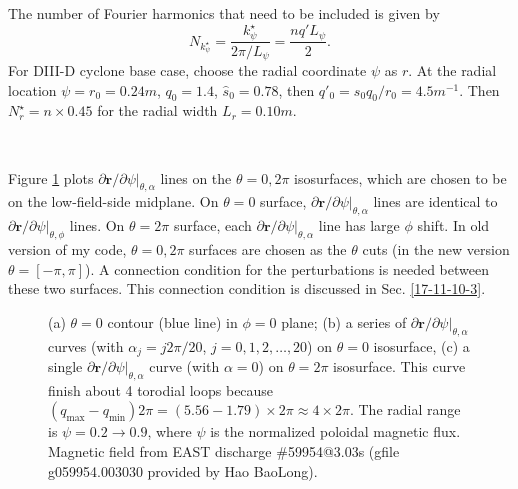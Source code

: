 \documentclass{article}
\newcommand{\nobracket}{}
\begin{document}
The number of Fourier harmonics that need to be included is given by
\begin{equation}
  N_{k_{\psi}^{\star}} = \frac{k_{\psi}^{\star}}{2 \pi / L_{\psi}} = \frac{n
  q' L_{\psi}}{2} .
\end{equation}
For DIII-D cyclone base case, choose the radial coordinate $\psi$ as $r$. At
the radial location $\psi = r_0 = 0.24 m$, $q_0 = 1.4$, $\hat{s}_0 = 0.78$,
then $q'_0 = s_0 q_0 / r_0 = 4.5 m^{- 1}$. Then $N_r^{\star} = n \times 0.45$
for the radial width $L_r = 0.10 m$.

\

Figure \ref{17-11-10-1} plots $\partial \mathbf{r}/ \partial \psi |
\nobracket_{\theta, \alpha}$ lines on the $\theta = 0, 2 \pi$ isosurfaces,
which are chosen to be on the low-field-side midplane. On $\theta = 0$
surface, $\partial \mathbf{r}/ \partial \psi |_{\theta, \alpha} \nobracket$
lines are identical to $\partial \mathbf{r}/ \partial \psi |_{\theta, \phi}
\nobracket$ lines. On $\theta = 2 \pi$ surface, each $\partial \mathbf{r}/
\partial \psi |_{\theta, \alpha} \nobracket$ line has large $\phi$ shift. In
old version of my code, $\theta = 0, 2 \pi$ surfaces are chosen as the
$\theta$ cuts (in the new version $\theta = [- \pi, \pi]$). A connection
condition for the perturbations is needed between these two surfaces. This
connection condition is discussed in Sec. \ref{17-11-10-3}.

\begin{figure}[h]
  \caption{\label{17-11-10-1}(a) $\theta = 0$ contour (blue line) in $\phi =
  0$ plane; (b) a series of $\partial \mathbf{r}/ \partial \psi |_{\theta,
  \alpha} \nobracket$ curves (with $\alpha_j = j 2 \pi / 20$, $j = 0, 1, 2,
  \ldots, 20$) on $\theta = 0$ isosurface, (c) a single $\partial \mathbf{r}/
  \partial \psi |_{\theta, \alpha} \nobracket$ curve (with $\alpha = 0$) on
  $\theta = 2 \pi$ isosurface. This curve finish about 4 torodial loops
  because $(q_{\max} - q_{\min}) 2 \pi = (5.56 - 1.79) \times 2 \pi \approx 4
  \times 2 \pi$. The radial range is $\psi = 0.2 \rightarrow 0.9$, where
  $\psi$ is the normalized poloidal magnetic flux. Magnetic field from EAST
  discharge \#59954@3.03s (gfile g059954.003030 provided by Hao BaoLong).}
\end{figure}
\end{document}
